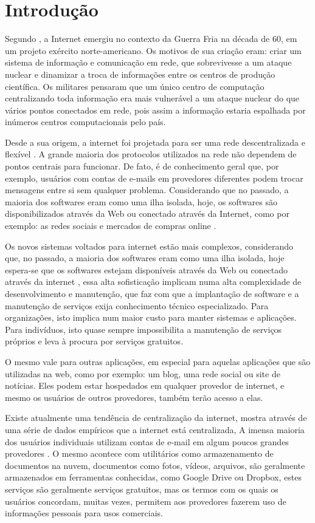 \chapter{Introdução}
\label{cap-introducao}

Segundo \cite{giles2010psychology}, a Internet emergiu no contexto da Guerra Fria na década
de 60, em um projeto exército norte-americano. Os motivos de sua criação eram:
criar um sistema de informação e comunicação em rede, que
sobrevivesse a um ataque nuclear e dinamizar a troca de informações entre os centros de
produção científica. Os militares pensaram que um único centro de computação
centralizando toda informação era mais vulnerável a um ataque nuclear do que vários
pontos conectados em rede, pois assim a informação estaria espalhada por inúmeros
centros computacionais pelo país.

Desde a sua origem, a internet foi projetada para ser uma rede
descentralizada e flexível \cite{galaxia}. A grande maioria dos protocolos 
utilizados na rede não dependem de pontos centrais para funcionar. 
De fato, é de conhecimento geral
que, por exemplo, usuários com contas de e-mails em provedores diferentes podem
trocar mensagens entre si sem qualquer problema. Considerando que no
passado, a maioria dos softwares eram como uma ilha isolada,
hoje, os softwares são disponibilizados através da Web ou conectado através da Internet,
como por exemplo: as redes sociais e mercados de compras online \cite{6265084}.

Os novos sistemas voltados para internet estão mais complexos, considerando que,
no passado, a maioria dos softwares eram
como uma ilha isolada, hoje espera-se que os softwares estejam disponíveis 
através da Web ou conectado através da internet \cite{byhand},
essa alta sofisticação implicam numa alta complexidade de
desenvolvimento e manutenção, que faz com que a
implantação de software e a manutenção de serviços exija conhecimento técnico
especializado. Para organizações, isto implica num maior
custo para manter sistemas e aplicações. Para indivíduos, isto quase sempre
impossibilita a manutenção de serviços próprios e leva à procura por serviços
gratuitos.

O mesmo vale para outras aplicações, em especial para aquelas aplicações
que são utilizadas na web, como por exemplo: um blog, uma rede social ou site de
notícias. Eles podem estar hospedados em qualquer provedor de internet, e mesmo os
usuários de outros provedores, também terão acesso a elas.

Existe atualmente uma tendência de centralização da internet,\cite{vaz} mostra 
através de uma série de dados empíricos que a internet está centralizada, 
A imensa maioria dos usuários individuais utilizam contas de e-mail em algum
poucos grandes provedores \cite{shak2015}. O mesmo acontece com utilitários como armazenamento
de documentos na nuvem, documentos como fotos, vídeos, arquivos, são geralmente
armazenados em ferramentas conhecidas, como Google Drive ou Dropbox, estes serviços 
são geralmente serviços gratuitos, mas os termos com os quais os usuários concordam, 
muitas vezes, permitem aos provedores fazerem uso de informações pessoais para usos comerciais.

